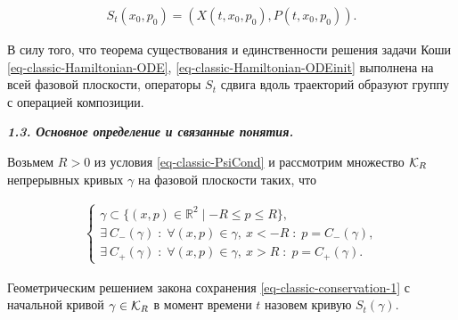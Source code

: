 \begin{gather}

S_t(x_0,p_0)=(X(t,x_0,p_0),P(t,x_0,p_0)).

\label{eq-classic-Hamiltonian-shift}

\end{gather}



В силу того, что теорема существования и единственности решения задачи Коши \eqref{eq-classic-Hamiltonian-ODE}, \eqref{eq-classic-Hamiltonian-ODEinit} выполнена на всей фазовой плоскости, операторы $S_t$ сдвига вдоль траекторий образуют группу с операцией композиции.



\smallskip



{\bf \itshape 1.3. Основное определение и связанные понятия.}

Возьмем $R>0$ из условия \eqref{eq-classic-PsiCond} и рассмотрим множество ${\cal K}_R$ непрерывных кривых $\gamma$ на фазовой плоскости таких, что

\begin{gather}

\left\{\begin{array}{l}

\gamma\subset\{(x,p)\in\mathbb{R}^2 \mid -R\le p\le R\},\\

\exists~ C_-(\gamma)\;:\;\forall (x,p)\in\gamma,~x<-R\;:\;p=C_-(\gamma),\\

\exists~ C_+(\gamma)\;:\;\forall (x,p)\in\gamma,~x>R\;:\;p=C_+(\gamma).

\end{array}\right.\label{eq-classic-KR-def}

\end{gather}



\smallskip



\hypertarget{palin:definition1}{}



\begin{definition}[1]Геометрическим решением закона сохранения \eqref{eq-classic-conservation-1} с начальной кривой $\gamma\in{\cal K}_R$ в момент времени $t$ назовем кривую $S_t(\gamma)$.

\end{definition}



